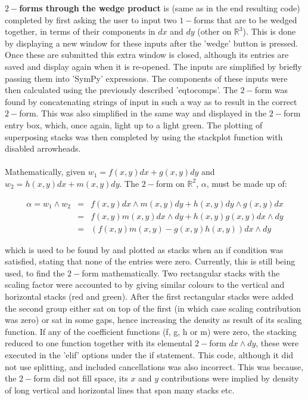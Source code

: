 \documentclass[12pt]{report}
\begin{document}
\textbf{$2-$forms through the wedge product} is (same as in the end resulting code) completed by first asking the user to input two $1-$forms that are to be wedged together, in terms of their components in $dx$ and $dy$ (other on $\mathbb{R}^{3}$). This is done by displaying a new window for these inputs after the 'wedge' button is pressed. Once these are submitted this extra window is closed, although its entries are saved and display again when it is re-opened. The inputs are simplified by briefly passing them into 'SymPy' expressions. The components of these inputs were then calculated using the previously described 'eq\textunderscore to\textunderscore comps'. The $2-$form was found by concatenating strings of input in such a way as to result in the correct $2-$form. This was also simplified in the same way and displayed in the $2-$form entry box, which, once again, light up to a light green. The plotting of superposing stacks was then completed by using the stack\textunderscore plot function with disabled arrowheads.\\~\\

Mathematically, given $w_{1} = f(x, y) dx + g(x, y) dy$  and $w_{2} = h(x, y) dx + m(x, y) dy$. The $2-$form on $\mathbb{R}^{2}$, $\alpha$, must be made up of:


\begin{eqnarray*}
	\label{T2}
		\alpha = w_{1}\wedge w_{2} &=& f(x, y) dx\wedge m(x, y) dy + h(x, y) dy\wedge g(x, y) dx\\
		&=&f(x, y)m(x, y) dx\wedge dy + h(x, y)g(x, y) dx\wedge dy \\&=& (f(x, y)m(x, y) - g(x, y)h(x, y)) dx\wedge dy  
\end{eqnarray*}


which is used to be found by and plotted as stacks when an if condition was satisfied, stating that none of the entries were zero. Currently, this is still being used, to find the $2 -$form mathematically.
Two rectangular stacks with the scaling factor were accounted to by giving similar colours to the vertical  and horizontal stacks (red and green). After the first rectangular stacks were added the second group either sat on top of the first (in which case scaling contribution was zero) or sat in some gaps, hence increasing the density as result of its scaling function.
If any of the coefficient functions (f, g, h or m) were zero, the stacking reduced to one function together with its elemental $2-$form $dx\wedge dy$, these were executed in the 'elif' options under the if statement. This code, although it did not use splitting, and included cancellations was also incorrect. This was because, the $2-$form did not fill space, its $x$ and $y$ contributions were implied by density of long vertical and horizontal lines that span many stacks etc.
\end{document}
